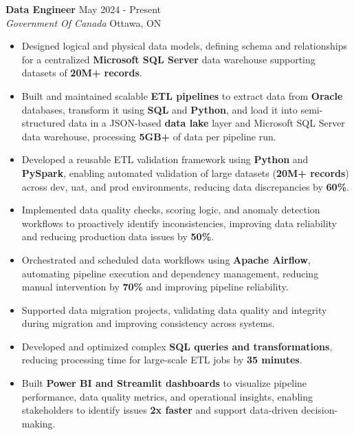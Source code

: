 \documentclass[a4paper]{article}
\begin{document}
\textbf{Data Engineer} \hfill May 2024 - Present\\
\textit{Government Of Canada} \hfill Ottawa, ON\\
\vspace{-2mm}
\begin{itemize} \itemsep -4pt \topsep 0pt

\item Designed logical and physical data models, defining schema and relationships for a centralized \textbf{Microsoft SQL Server} data warehouse supporting datasets of \textbf{20M+ records}.

\item Built and maintained scalable \textbf{ETL pipelines} to extract data from \textbf{Oracle} databases, transform it using \textbf{SQL} and \textbf{Python}, and load it into semi-structured data in a JSON-based \textbf{data lake} layer and Microsoft SQL Server data warehouse, processing \textbf{5GB+} of data per pipeline run.

\item Developed a reusable ETL validation framework using \textbf{Python} and \textbf{PySpark}, enabling automated validation of large datasets (\textbf{20M+ records}) across dev, uat, and prod environments, reducing data discrepancies by \textbf{60\%}.

\item Implemented data quality checks, scoring logic, and anomaly detection workflows to proactively identify inconsistencies, improving data reliability and reducing production data issues by \textbf{50\%}.

\item Orchestrated and scheduled data workflows using \textbf{Apache Airflow}, automating pipeline execution and dependency management, reducing manual intervention by \textbf{70\%} and improving pipeline reliability.

\item Supported data migration projects, validating data quality and integrity during migration and improving consistency across systems.

\item Developed and optimized complex \textbf{SQL queries and transformations}, reducing processing time for large-scale ETL jobs by \textbf{35 minutes}.

\item Built \textbf{Power BI and Streamlit dashboards} to visualize pipeline performance, data quality metrics, and operational insights, enabling stakeholders to identify issues \textbf{2x faster} and support data-driven decision-making.


\end{itemize}
\end{document}
